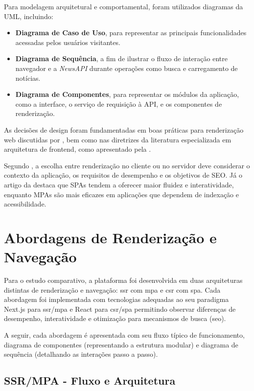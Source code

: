 Para modelagem arquitetural e comportamental, foram utilizados diagramas da UML, incluindo:
\begin{itemize}
  \item \textbf{Diagrama de Caso de Uso}, para representar as principais funcionalidades acessadas pelos usuários visitantes.
  \item \textbf{Diagrama de Sequência}, a fim de ilustrar o fluxo de interação entre navegador e a \textit{NewsAPI} durante operações como busca e carregamento de notícias.
  \item \textbf{Diagrama de Componentes}, para representar os módulos da aplicação, como a interface, o serviço de requisição à API, e os componentes de renderização.
\end{itemize}

As decisões de design foram fundamentadas em boas práticas para renderização web discutidas por \cite{osmani2025}, bem como nas diretrizes da literatura especializada em arquitetura de frontend, como apresentado pela \cite{atori2024}.

Segundo \cite{osmani2025}, a escolha entre renderização no cliente ou no servidor deve considerar o contexto da aplicação, os requisitos de desempenho e os objetivos de SEO. Já o artigo da \cite{atori2024} destaca que SPAs tendem a oferecer maior fluidez e interatividade, enquanto MPAs são mais eficazes em aplicações que dependem de indexação e acessibilidade.

\section{Abordagens de Renderização e Navegação}
\label{section:abordagens-renderizacao}

Para o estudo comparativo, a plataforma foi desenvolvida em duas arquiteturas distintas de renderização e navegação: 
\acrfull{ssr} com \acrfull{mpa} e \acrfull{csr} com \acrfull{spa}.  
Cada abordagem foi implementada com tecnologias adequadas ao seu paradigma Next.js para \acrshort{ssr}/\acrshort{mpa} e React para \acrshort{csr}/\acrshort{spa}  permitindo observar diferenças de desempenho, interatividade e otimização para mecanismos de busca (\acrshort{seo}).

A seguir, cada abordagem é apresentada com seu fluxo típico de funcionamento, diagrama de componentes (representando a estrutura modular) e diagrama de sequência (detalhando as interações passo a passo).

\subsection{SSR/MPA - Fluxo e Arquitetura}
\label{subsec:ssr-mpa}

